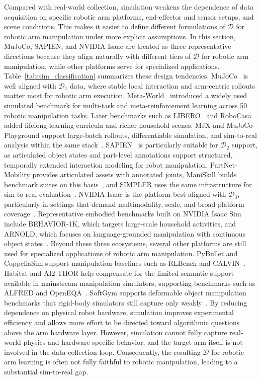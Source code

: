 \documentclass[acmsmall,screen,review]{acmart}
\begin{document}
Compared with real-world collection, simulation weakens the dependence of data acquisition on specific robotic arm platforms, end-effector and sensor setups, and scene conditions. 
This makes it easier to define different formulations of \(\mathcal{D}\) for robotic arm manipulation under more explicit assumptions.
In this section, MuJoCo, SAPIEN, and NVIDIA Isaac are treated as three representative directions because they align naturally with different tiers of \(\mathcal{D}\)  for robotic arm manipulation, while other platforms serve for specialized applications. Table~\ref{tab:sim_classification} summarizes these design tendencies.
MuJoCo~\cite{todorov2012mujoco} is well aligned with \(\mathcal{D}_1\) data, where stable local interaction and arm-centric rollouts matter most for robotic arm execution.
Meta-World~\cite{yu2021meta} introduced a widely used simulated benchmark for multi-task and meta-reinforcement learning across 50 robotic manipulation tasks.
Later benchmarks such as LIBERO~\cite{liu2023libero} and RoboCasa~\cite{nasiriany2024robocasa} added lifelong-learning curricula and richer household scenes. 
MJX and MuJoCo Playground support large-batch rollouts, differentiable simulation, and sim-to-real analysis within the same stack~\cite{deepmind2025playground}.
SAPIEN~\cite{xiang2020sapien} is particularly suitable for \(\mathcal{D}_2\) support, as articulated object states and part-level annotations support structured, temporally extended interaction modeling for robot manipulation.
PartNet-Mobility provides articulated assets with annotated joints, ManiSkill builds benchmark suites on this basis~\cite{tao2025maniskill3}, 
and SIMPLER uses the same infrastructure for sim-to-real evaluation~\cite{li2025simpler}.
NVIDIA Isaac is the platform best aligned with \(\mathcal{D}_3\), particularly in settings that demand multimodality, scale, and broad platform coverage~\cite{mittal2023orbit}. 
Representative embodied benchmarks built on NVIDIA Isaac Sim include BEHAVIOR-1K, which targets large-scale household activities, 
and ARNOLD, which focuses on language-grounded manipulation with continuous object states~\cite{li2024behavior1k, gong2023arnold}.
Beyond these three ecosystems, several other platforms are still used for specialized applications of robotic arm manipulation.
PyBullet and CoppeliaSim support manipulation baselines such as RLBench and CALVIN~\cite{james2020rlbench, mees2022calvin}.
Habitat and AI2-THOR help compensate for the limited semantic support available in mainstream manipulation simulators, supporting benchmarks such as ALFRED and OpenEQA~\cite{shridhar2020alfred, majumdar2024openeqa}.
SoftGym supports deformable object manipulation benchmarks that rigid-body simulators still capture only weakly~\cite{lin2021softgym}.
By reducing dependence on physical robot hardware, simulation improves experimental efficiency and allows more effort to be directed toward algorithmic questions above the arm hardware layer. 
However, simulation cannot fully capture real-world physics and hardware-specific behavior, and the target arm itself is not involved in the data collection loop.
Consequently, the resulting \(\mathcal{D}\) for robotic arm learning is often not fully faithful to robotic manipulation, leading to a substantial sim-to-real gap.
\end{document}
